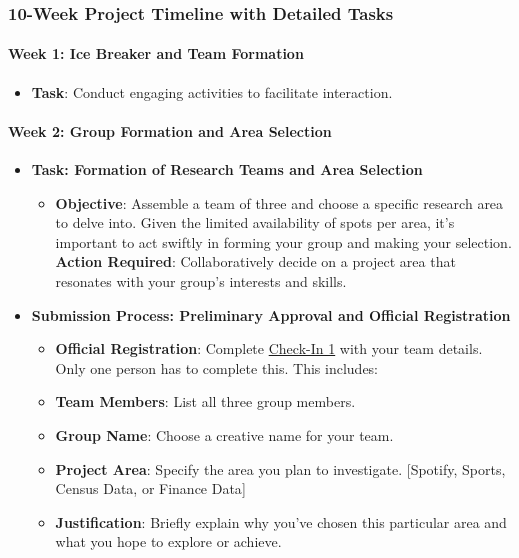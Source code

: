 \documentclass[
  letterpaper,
  DIV=11,
  numbers=noendperiod]{scrartcl}
\let\oldparagraph\paragraph
\renewcommand{\paragraph}[1]{\oldparagraph{#1}\mbox{}}
\providecommand{\tightlist}{%
  \setlength{\itemsep}{0pt}\setlength{\parskip}{0pt}}\usepackage{longtable,booktabs,array}
\begin{document}
\hypertarget{week-project-timeline-with-detailed-tasks}{%
\subsubsection{10-Week Project Timeline with Detailed
Tasks}\label{week-project-timeline-with-detailed-tasks}}

\hypertarget{week-1-ice-breaker-and-team-formation}{%
\paragraph{Week 1: Ice Breaker and Team
Formation}\label{week-1-ice-breaker-and-team-formation}}

\begin{itemize}
\tightlist
\item
  \textbf{Task}: Conduct engaging activities to facilitate interaction.
\end{itemize}

\hypertarget{week-2-group-formation-and-area-selection}{%
\paragraph{Week 2: Group Formation and Area
Selection}\label{week-2-group-formation-and-area-selection}}

\begin{itemize}
\tightlist
\item
  \textbf{Task: Formation of Research Teams and Area Selection}

  \begin{itemize}
  \tightlist
  \item
    \textbf{Objective}: Assemble a team of three and choose a specific
    research area to delve into. Given the limited availability of spots
    per area, it's important to act swiftly in forming your group and
    making your selection. \textbf{Action Required}: Collaboratively
    decide on a project area that resonates with your group's interests
    and skills.
  \end{itemize}
\item
  \textbf{Submission Process: Preliminary Approval and Official
  Registration}

  \begin{itemize}
  \item
    \textbf{Official Registration}: Complete
    \href{https://forms.gle/FE64581hRqh8ppAMA}{Check-In 1} with your
    team details. Only one person has to complete this. This includes:
  \item
    \textbf{Team Members}: List all three group members.
  \item
    \textbf{Group Name}: Choose a creative name for your team.
  \item
    \textbf{Project Area}: Specify the area you plan to investigate.
    {[}Spotify, Sports, Census Data, or Finance Data{]}
  \item
    \textbf{Justification}: Briefly explain why you've chosen this
    particular area and what you hope to explore or achieve.
  \end{itemize}
\end{itemize}
\end{document}
